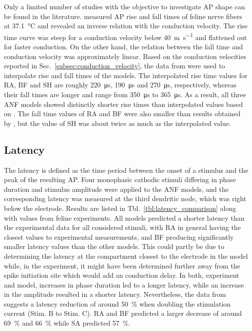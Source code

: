 \documentclass[utf8]{frontiersSCNS} %
\begin{document}
Only a limited number of studies with the objective to investigate AP shape can be found in the literature. \cite{Paintal1966} measured AP rise and fall times of feline nerve fibers at \SI{37.1}{\celsius} and revealed an inverse relation with the conduction velocity. The rise time curve was steep for a conduction velocity below \SI{40}{\meter\second^{-1}} and flattened out for faster conduction. On the other hand, the relation between the fall time and conduction velocity was approximately linear.
Based on the conduction velocities reported in Sec.\ \ref{subsec:conduction_velocity}, the data from \cite{Paintal1966} were used to interpolate rise and fall times of the models. The interpolated rise time values for RA, BF and SH are roughly \SI{220}{\micro\second}, \SI{190}{\micro\second} and \SI{270}{\micro\second}, respectively, whereas their fall times are longer and range from \SI{350}{\micro\second} to \SI{365}{\micro\second}. As a result, all three ANF models showed distinctly shorter rise times than interpolated values based on \cite{Paintal1966}. The fall time values of RA and BF were also smaller than results obtained by \cite{Paintal1966}, but the value of SH was about twice as much as the interpolated value.

\subsection{Latency}
\label{subsec:latency}
The latency is defined as the time period between the onset of a stimulus and the peak of the resulting AP. Four monophasic cathodic stimuli differing in phase duration and stimulus amplitude were applied to the ANF models, and the corresponding latency was measured at the third dendritic node, which was right below the electrode. Results are listed in Tbl.\ \ref{tbl:latency_comparison} along with values from feline experiments.
All models predicted a shorter latency than the experimental data for all considered stimuli, with RA in general having the closest values to experimental measurements, and BF producing significantly smaller latency values than the other models. This could partly be due to determining the latency at the compartment closest to the electrode in the model while, in the experiment, it might have been determined further away from the spike initiation site which would add an conduction delay. In both, experiment and model, increases in phase duration led to a longer latency, while an increase in the amplitude resulted in a shorter latency. Nevertheless, the data from \cite{VandenHonert1984} suggests a latency reduction of around \SI{50}{\percent} when doubling the stimulation current (Stim. B to Stim. C). RA and BF predicted a larger decrease of around \SI{69}{\percent} and \SI{66}{\percent} while SA predicted \SI{57}{\percent}.
\end{document}
